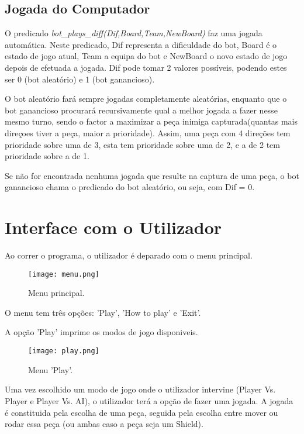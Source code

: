 \documentclass[a4paper]{article}
\begin{document}
\subsection{Jogada do Computador}%
O predicado \textit{bot\_plays\_diff(Dif,Board,Team,NewBoard)} faz uma jogada automática.
Neste predicado, Dif representa a dificuldade do bot, Board é o estado de jogo atual, Team a equipa do bot e NewBoard o novo estado de jogo depois de efetuada a jogada. Dif pode tomar 2 valores possíveis, podendo estes ser 0 (bot aleatório) e 1 (bot ganancioso).

O bot aleatório fará sempre jogadas completamente aleatórias, enquanto que o bot ganancioso procurará recursivamente qual a melhor jogada a fazer nesse mesmo turno, sendo o factor a maximizar a peça inimiga capturada(quantas mais direçoes tiver a peça, maior a prioridade). Assim, uma peça com 4 direções tem prioridade sobre uma de 3, esta tem prioridade sobre uma de 2, e a de 2 tem prioridade sobre a de 1.

Se não for encontrada nenhuma jogada que resulte na captura de uma peça, o bot ganancioso chama o predicado do bot aleatório, ou seja, com Dif = 0.

\section{Interface com o Utilizador}
Ao correr o programa, o utilizador é deparado com o menu principal.

\begin{figure}
\caption{Menu principal.}
\centering
\texttt{[image: menu.png]}
\end{figure}

O menu tem três opções: 'Play', 'How to play' e 'Exit'.

A opção 'Play' imprime os modos de jogo disponiveis.

\begin{figure}
\caption{Menu 'Play'.}
\centering
\texttt{[image: play.png]}
\end{figure}

Uma vez escolhido um modo de jogo onde o utilizador intervine (Player Vs. Player e Player Vs. AI), o utilizador terá a opção de fazer uma jogada.
A jogada é constituida pela escolha de uma peça, seguida pela escolha entre mover ou rodar essa peça (ou ambas caso a peça seja um Shield).
\end{document}
